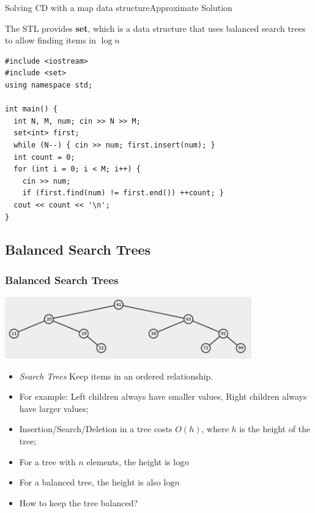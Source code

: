 \begin{frame}[fragile]{Solving CD with a map data structure}{Approximate Solution}

  The STL provides {\bf set}, which is a data structure that uses balanced search trees to allow finding items in $\log n$

{\smaller
  \begin{block}{}
\begin{verbatim}
#include <iostream>
#include <set>
using namespace std;

int main() {
  int N, M, num; cin >> N >> M;
  set<int> first;
  while (N--) { cin >> num; first.insert(num); }
  int count = 0;
  for (int i = 0; i < M; i++) {
    cin >> num;
    if (first.find(num) != first.end()) ++count; }
  cout << count << '\n';
}
\end{verbatim}
\end{block}}
\end{frame}



\subsection{Balanced Search Trees}

\begin{frame}
  \frametitle{Balanced Search Trees}
  \begin{center}
    \includegraphics[width=0.8\textwidth]{img/BST}
  \end{center}
  \begin{itemize}
  \item \emph{Search Trees} Keep items in an ordered relationship.
  \item For example: Left children always have smaller values, Right
    children always have larger values;
  \item Insertion/Search/Deletion in a tree costs $O(h)$, where $h$ is
    the height of the tree;
  \item For a tree with $n$ elements, the  height
    is $\text{log}n$
  \item For a balanced tree, the  height is also
    $\text{log}n$
  \item How to keep the tree balanced?
  \end{itemize}
\end{frame}


